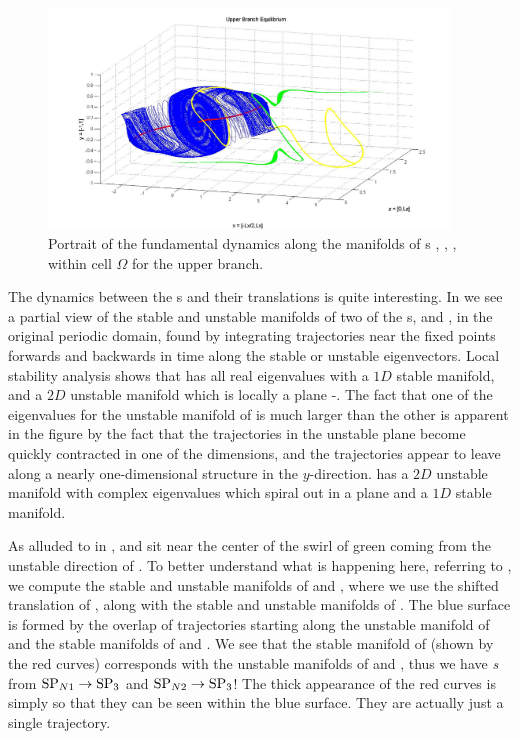 \documentclass[lineno]{jfm}
\begin{document}
  \begin{figure}
\includegraphics[width=0.95\textwidth]{june4_fig7.jpg}
  \caption{
Portrait of the fundamental dynamics along the manifolds of \stagp s 
, , ,  within cell $\Omega$ for the upper 
branch. 
   }
  \label{fig:hetero2}
 \end{figure}

The dynamics between the \stagp s and their translations is quite 
interesting. In  we see a partial view of 
the stable and unstable manifolds of two of the {\stagp}s,  and 
, in the original periodic domain, found by integrating 
trajectories near the fixed points forwards and backwards in time along 
the stable or unstable eigenvectors. Local stability analysis shows that 
 has all real eigenvalues with a $1D$ stable manifold, and a $2D$ 
unstable manifold which is locally a plane 
-. The fact that one of the eigenvalues 
for the unstable manifold of  is much larger than the other is 
apparent in the figure by the fact that the trajectories in the unstable 
plane become quickly contracted in one of the dimensions, and the 
trajectories appear to leave along a nearly one-dimensional structure in 
the $y$-direction.  has a $2D$ unstable manifold with complex 
eigenvalues which spiral out in a plane and a $1D$ stable manifold. 
 
As alluded to in ,  and  
sit near the center of the swirl of green coming from the unstable 
direction of . To better understand what is happening here, 
referring to , we compute the  stable and 
unstable manifolds of  and , where we use the shifted 
translation of , along with the stable and unstable manifolds of 
. The blue surface is formed by the overlap of trajectories 
starting along the unstable manifold of  and the stable manifolds 
of  and .  We see that the stable manifold of  
(shown by the red curves) corresponds with the unstable manifolds of 
 and , thus we have \emph{{\hc}s} from ${{\text{SP}_{N1}}}\to{\ensuremath{{\text{SP}_{3}}}}$
 and ${{\text{SP}_{N2}}}\to{\ensuremath{{\text{SP}_{3}}}}$! The thick appearance of the red curves 
is simply so that they can be seen within the blue surface. They are 
actually just a single trajectory. 
 
\end{document}
